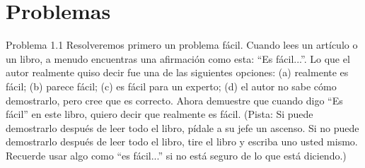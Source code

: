 \section{Problemas}

Problema 1.1 Resolveremos primero un problema fácil. Cuando lees un artículo o un libro, a menudo encuentras una afirmación como esta: ``Es fácil...''. Lo que el autor realmente quiso decir fue una de las siguientes opciones: (a) realmente es fácil; (b) parece fácil; (c) es fácil para un experto; (d) el autor no sabe cómo demostrarlo, pero cree que es correcto. Ahora demuestre que cuando digo ``Es fácil'' en este libro, quiero decir que realmente es fácil. (Pista: Si puede demostrarlo después de leer todo el libro, pídale a su jefe un ascenso. Si no puede demostrarlo después de leer todo el libro, tire el libro y escriba uno usted mismo. Recuerde usar algo como ``es fácil...'' si no está seguro de lo que está diciendo.)